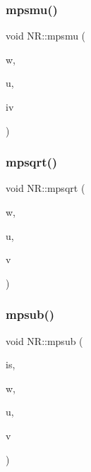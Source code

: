\mbox{\label{namespaceNR_a7e4bcd285f6961beca936346cd63f092}} 
\subsubsection{\texorpdfstring{mpsmu()}{mpsmu()}}
{\footnotesize\ttfamily void N\+R\+::mpsmu (\begin{DoxyParamCaption}\item[{\mbox{\hyperlink{namespaceNR_ac322e5f1208609bf101390ed2495b7d5}{Vec\+\_\+\+O\+\_\+\+U\+C\+HR}} \&}]{w,  }\item[{\mbox{\hyperlink{namespaceNR_ace0fbcd7daadfbf5e4e7db2a317a5b46}{Vec\+\_\+\+I\+\_\+\+U\+C\+HR}} \&}]{u,  }\item[{const int}]{iv }\end{DoxyParamCaption})}

\mbox{\label{namespaceNR_a73de1f888d26e631949996bd1e437659}} 
\subsubsection{\texorpdfstring{mpsqrt()}{mpsqrt()}}
{\footnotesize\ttfamily void N\+R\+::mpsqrt (\begin{DoxyParamCaption}\item[{\mbox{\hyperlink{namespaceNR_ac322e5f1208609bf101390ed2495b7d5}{Vec\+\_\+\+O\+\_\+\+U\+C\+HR}} \&}]{w,  }\item[{\mbox{\hyperlink{namespaceNR_ac322e5f1208609bf101390ed2495b7d5}{Vec\+\_\+\+O\+\_\+\+U\+C\+HR}} \&}]{u,  }\item[{\mbox{\hyperlink{namespaceNR_ace0fbcd7daadfbf5e4e7db2a317a5b46}{Vec\+\_\+\+I\+\_\+\+U\+C\+HR}} \&}]{v }\end{DoxyParamCaption})}

\mbox{\label{namespaceNR_a6c829dc4c09a73a1c6f91c817b01bfd4}} 
\subsubsection{\texorpdfstring{mpsub()}{mpsub()}}
{\footnotesize\ttfamily void N\+R\+::mpsub (\begin{DoxyParamCaption}\item[{int \&}]{is,  }\item[{\mbox{\hyperlink{namespaceNR_ac322e5f1208609bf101390ed2495b7d5}{Vec\+\_\+\+O\+\_\+\+U\+C\+HR}} \&}]{w,  }\item[{\mbox{\hyperlink{namespaceNR_ace0fbcd7daadfbf5e4e7db2a317a5b46}{Vec\+\_\+\+I\+\_\+\+U\+C\+HR}} \&}]{u,  }\item[{\mbox{\hyperlink{namespaceNR_ace0fbcd7daadfbf5e4e7db2a317a5b46}{Vec\+\_\+\+I\+\_\+\+U\+C\+HR}} \&}]{v }\end{DoxyParamCaption})}

